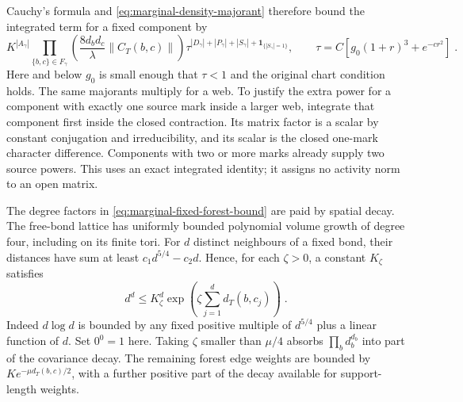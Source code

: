 \documentclass[11pt]{article}
\begin{document}
Cauchy's formula and \eqref{eq:marginal-density-majorant} therefore bound the integrated term for a fixed component by
\begin{equation}\label{eq:marginal-fixed-forest-bound}
    K^{|A_\gamma|}
        \prod_{\{b,c\}\in F_\gamma}
            \left(\frac{8d_bd_c}{\lambda}\|C_T(b,c)\|\right)
        \tau^{|D_\gamma|+|P_\gamma|+|S_\gamma|
            +\mathbf1_{\{|S_\gamma|=1\}}},
    \qquad
    \tau=C\left[g_0(1+r)^3+e^{-cr^2}\right]\;.
\end{equation}
Here and below $g_0$ is small enough that $\tau<1$ and the original chart condition holds. The same majorants multiply for a web. To justify the extra power for a component with exactly one source mark inside a larger web, integrate that component first inside the closed contraction. Its matrix factor is a scalar by constant conjugation and irreducibility, and its scalar is the closed one-mark character difference. Components with two or more marks already supply two source powers. This uses an exact integrated identity; it assigns no activity norm to an open matrix.

The degree factors in \eqref{eq:marginal-fixed-forest-bound} are paid by spatial decay. The free-bond lattice has uniformly bounded polynomial volume growth of degree four, including on its finite tori. For $d$ distinct neighbours of a fixed bond, their distances have sum at least $c_1d^{5/4}-c_2d$. Hence, for each $\zeta>0$, a constant $K_\zeta$ satisfies
\begin{equation}\label{eq:marginal-degree-payment}
    d^d\leq K_\zeta^d
        \exp\left(\zeta\sum_{j=1}^d d_T(b,c_j)\right)\;.
\end{equation}
Indeed $d\log d$ is bounded by any fixed positive multiple of $d^{5/4}$ plus a linear function of $d$. Set $0^0=1$ here. Taking $\zeta$ smaller than $\mu/4$ absorbs $\prod_b d_b^{d_b}$ into part of the covariance decay. The remaining forest edge weights are bounded by $K e^{-\mu d_T(b,c)/2}$, with a further positive part of the decay available for support-length weights.
\end{document}
